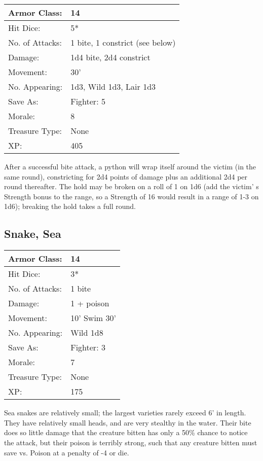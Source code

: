 \documentclass[a4paper,twoside,openany,10pt]{book}
\begin{document}
\begin{multicols}{2}
\begin{tabularx}{0.50\textwidth}{@{}lX@{}}
Armor Class: & 14 \\\hline
Hit Dice: & 5* \\\hline
No. of Attacks: & 1 bite, 1 constrict (see below) \\\hline
Damage: & 1d4 bite, 2d4 constrict \\\hline
Movement: & 30' \\\hline
No. Appearing: & 1d3, Wild 1d3, Lair 1d3 \\\hline
Save As: & Fighter: 5 \\\hline
Morale: & 8 \\\hline
Treasure Type: & None \\\hline
XP: & 405 \\\hline
\end{tabularx}\medskip

After a successful bite attack, a python will wrap itself around the victim (in the same round), constricting for 2d4 points of damage plus an additional 2d4 per round thereafter. The hold may be broken on a roll of 1 on 1d6 (add the victim' s Strength bonus to the range, so a Strength of 16 would result in a range of 1-3 on 1d6); breaking the hold takes a full round.

\subsection*{Snake, Sea}\label{snake-sea}

\begin{tabularx}{0.50\textwidth}{@{}lX@{}}
Armor Class: & 14 \\\hline
Hit Dice: & 3* \\\hline
No. of Attacks: & 1 bite \\\hline
Damage: & 1 + poison \\\hline
Movement: & 10' Swim 30' \\\hline
No. Appearing: & Wild 1d8 \\\hline
Save As: & Fighter: 3 \\\hline
Morale: & 7 \\\hline
Treasure Type: & None \\\hline
XP: & 175 \\\hline
\end{tabularx}\medskip

Sea snakes are relatively small; the largest varieties rarely exceed 6' in length. They have relatively small heads, and are very stealthy in the water. Their bite does so little damage that the creature bitten has only a 50\% chance to notice the attack, but their poison is terribly strong, such that any creature bitten must save vs. Poison at a penalty of -4 or die.


\end{multicols}
\end{document}
